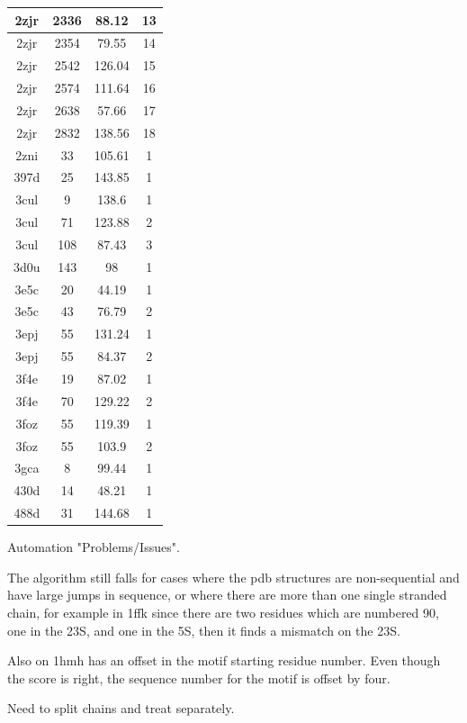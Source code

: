 \begin{center}
\begin{longtable}{c|c|c|c}
2zjr & 2336 & 88.12 & 13 \\ \hline
2zjr & 2354 & 79.55 & 14 \\ \hline
2zjr & 2542 & 126.04 & 15 \\ \hline
2zjr & 2574 & 111.64 & 16 \\ \hline
2zjr & 2638 & 57.66 & 17 \\ \hline
2zjr & 2832 & 138.56 & 18 \\ \hline
2zni & 33 & 105.61 & 1 \\ \hline
397d & 25 & 143.85 & 1 \\ \hline
3cul & 9 & 138.6 & 1 \\ \hline
3cul & 71 & 123.88 & 2 \\ \hline
3cul & 108 & 87.43 & 3 \\ \hline
3d0u & 143 & 98 & 1 \\ \hline
3e5c & 20 & 44.19 & 1 \\ \hline
3e5c & 43 & 76.79 & 2 \\ \hline
3epj & 55 & 131.24 & 1 \\ \hline
3epj & 55 & 84.37 & 2 \\ \hline
3f4e & 19 & 87.02 & 1 \\ \hline
3f4e & 70 & 129.22 & 2 \\ \hline
3foz & 55 & 119.39 & 1 \\ \hline
3foz & 55 & 103.9 & 2 \\ \hline
3gca & 8 & 99.44 & 1 \\ \hline
430d & 14 & 48.21 & 1 \\ \hline
488d & 31 & 144.68 & 1 \\ \hline
\end{longtable}
\end{center}


Automation "Problems/Issues".


The  algorithm still  falls for  cases  where the  pdb structures  are
non-sequential and  have large jumps  in sequence, or where  there are
more than one  single stranded chain, for example  in 1ffk since there
are two residues which are numbered 90, one in the 23S, and one in the
5S, then it finds a mismatch on the 23S.

Also on 1hmh has an offset  in the motif starting residue number. Even
though the score is right, the sequence number for the motif is offset
by four.

Need to split chains and treat separately.





